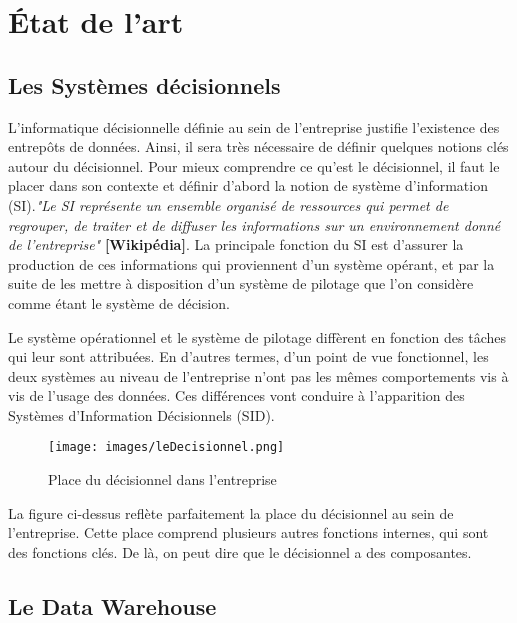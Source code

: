 \documentclass[12pt,a4wide,twoside]{report}
\begin{document}
	\section{État de l'art}
	
\subsection{Les Systèmes décisionnels}
	L'informatique décisionnelle définie au sein de l'entreprise justifie l'existence des entrepôts de données. Ainsi, il sera très nécessaire de définir quelques notions clés autour du décisionnel.\newline
	Pour mieux comprendre ce qu'est le décisionnel, il faut le placer dans son contexte et définir d'abord la notion de système d'information (SI).\emph{"Le SI représente un ensemble organisé de ressources qui permet de regrouper, de traiter et de diffuser les informations sur un environnement donné de l'entreprise"} \textbf{[Wikipédia]}.\newline
La principale fonction du SI est d'assurer la production de ces informations qui proviennent d'un système opérant, et par la suite de les mettre à disposition d'un système de pilotage que l'on considère comme étant le système de décision.

Le système opérationnel et le système de pilotage diffèrent en fonction des tâches qui leur sont attribuées. En d'autres termes, d'un point de vue fonctionnel, les deux systèmes au niveau de l'entreprise n'ont pas les mêmes comportements vis à vis de l'usage des données. Ces différences vont conduire à l'apparition des Systèmes d'Information Décisionnels (SID).
\begin{figure}[!h]
\begin{center}
	\texttt{[image: images/leDecisionnel.png]}
\end{center}
\caption{Place du décisionnel dans l'entreprise}
\end{figure}

La figure ci-dessus reflète parfaitement la place du décisionnel au sein de l'entreprise. Cette place comprend plusieurs autres fonctions internes, qui sont des fonctions clés. De là, on peut dire que le décisionnel a des composantes.

\subsection{Le Data Warehouse}
\end{document}
